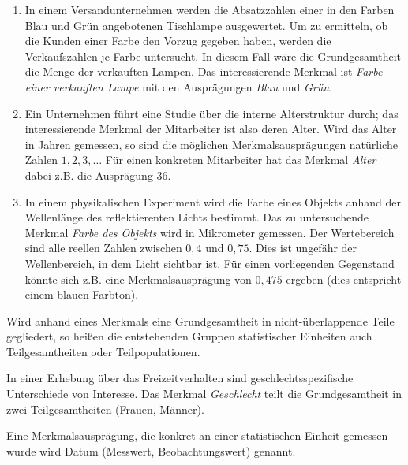 \documentclass{lecture}
\begin{document}
    \begin{example}
        \begin{enumerate}
            \item In einem Versandunternehmen werden die Absatzzahlen einer in den Farben Blau und Grün angebotenen Tischlampe ausgewertet.
            Um zu ermitteln, ob die Kunden einer Farbe den Vorzug gegeben haben, werden die Verkaufszahlen je Farbe untersucht.
            In diesem Fall wäre die Grundgesamtheit die Menge der verkauften Lampen.
            Das interessierende Merkmal ist \emph{Farbe einer verkauften Lampe} mit den Ausprägungen \emph{Blau} und \emph{Grün}.
            \item Ein Unternehmen führt eine Studie über die interne Alterstruktur durch; das interessierende Merkmal der Mitarbeiter ist also deren Alter.
            Wird das Alter in Jahren gemessen, so sind die möglichen Merkmalsausprägungen natürliche Zahlen \(1, 2, 3, \ldots\)
            Für einen konkreten Mitarbeiter hat das Merkmal \emph{Alter} dabei z.B. die Ausprägung \(36\).
            \item In einem physikalischen Experiment wird die Farbe eines Objekts anhand der Wellenlänge des reflektierenten Lichts bestimmt.
            Das zu untersuchende Merkmal \emph{Farbe des Objekts} wird in Mikrometer gemessen.
            Der Wertebereich sind alle reellen Zahlen zwischen \(0,4\) und \(0,75\).
            Dies ist ungefähr der Wellenbereich, in dem Licht sichtbar ist.
            Für einen vorliegenden Gegenstand könnte sich z.B. eine Merkmalsausprägung von \(0,475\) ergeben (dies entspricht einem blauen Farbton).
        \end{enumerate}
    \end{example}

    Wird anhand eines Merkmals eine Grundgesamtheit in nicht-überlappende Teile gegliedert, so heißen die entstehenden Gruppen statistischer Einheiten auch Teilgesamtheiten oder Teilpopulationen.

    \begin{example}
        In einer Erhebung über das Freizeitverhalten sind geschlechtsspezifische Unterschiede von Interesse.
        Das Merkmal \emph{Geschlecht} teilt die Grundgesamtheit in zwei Teilgesamtheiten (Frauen, Männer).
    \end{example}

    Eine Merkmalsausprägung, die konkret an einer statistischen Einheit gemessen wurde wird Datum (Messwert, Beobachtungswert) genannt.
\end{document}
